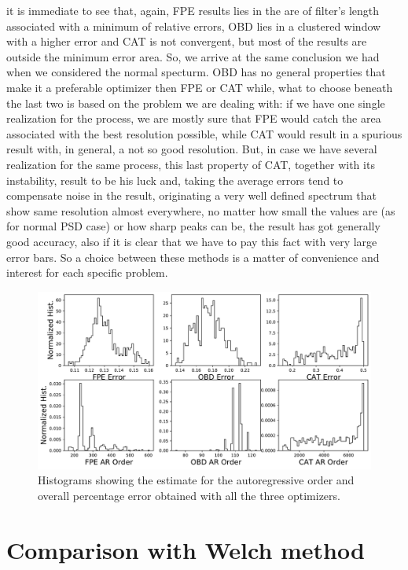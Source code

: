 \documentclass[twocolumn,showpacs,preprintnumbers,nofootinbib,prd,
superscriptaddress,10pt]{revtex4-1}
\begin{document}
it is immediate to see that, again, FPE results lies in the are of filter's length associated with a minimum of relative errors, OBD lies in a clustered window with a higher error and CAT is not convergent, but most of the results are outside the minimum error area. So, we arrive at the same conclusion we had when we considered the normal specturm. OBD has no general properties that make it a preferable optimizer then FPE or CAT while, what to choose beneath the last two is based on the problem we are dealing with: if we have one single realization for the process, we are mostly sure that FPE would catch the area associated with the best resolution possible, while CAT would result in a spurious result with, in general, a not so good resolution. But, in case we have several realization for the same process, this last property of CAT, together with its instability, result to be his luck and, taking the average errors tend to compensate noise in the result, originating a very well defined spectrum that show same resolution almost everywhere, no matter how small the values are (as for normal PSD case) or how sharp peaks can be, the result has got generally good accuracy, also if it is clear that we have to pay this fact with very large error bars. So a choice between these methods is a matter of convenience and interest for each specific problem. \\
\begin{figure}
    \centering
    \includegraphics[width = \linewidth]{Images/LIGOsimulate/LigoHists.pdf}
    \caption{Histograms showing the estimate for the autoregressive order and overall percentage error obtained with all the three optimizers.}
    \label{fig:my_label}
\end{figure}

\section{Comparison with Welch method}
\end{document}
